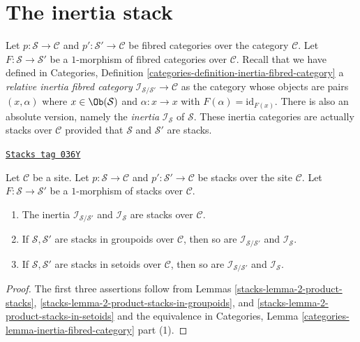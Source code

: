 \section{The inertia stack}
\label{stacks-section-the-inertia-stack}
Let
$p : \mathcal{S} \to \mathcal{C}$ and
$p' : \mathcal{S}' \to \mathcal{C}$
be fibred categories over the category $\mathcal{C}$.
Let $F : \mathcal{S} \to \mathcal{S}'$ be a $1$-morphism of
fibred categories over $\mathcal{C}$.
Recall that we have defined in
Categories, Definition \ref{categories-definition-inertia-fibred-category}
a {\it relative inertia fibred category}
$\mathcal{I}_{\mathcal{S}/\mathcal{S}'} \to \mathcal{C}$ as the
category whose objects are pairs $(x , \alpha)$ where
$x \in \Ob(\mathcal{S})$ and $\alpha : x \to x$ with
$F(\alpha) = \text{id}_{F(x)}$. There is also an absolute version,
namely the {\it inertia} $\mathcal{I}_\mathcal{S}$ of $\mathcal{S}$.
These inertia categories are actually stacks over $\mathcal{C}$ provided
that $\mathcal{S}$ and $\mathcal{S}'$ are stacks.

\begin{lemma}[Inertia]
\label{stacks-lemma-inertia}
\href{https://stacks.math.columbia.edu/tag/036Y}{\texttt{Stacks tag 036Y}}

Let $\mathcal{C}$ be a site. Let
$p : \mathcal{S} \to \mathcal{C}$ and
$p' : \mathcal{S}' \to \mathcal{C}$
be stacks over the site $\mathcal{C}$.
Let $F : \mathcal{S} \to \mathcal{S}'$ be a $1$-morphism of
stacks over $\mathcal{C}$.
\begin{enumerate}
\item The inertia $\mathcal{I}_{\mathcal{S}/\mathcal{S}'}$ and
$\mathcal{I}_\mathcal{S}$ are stacks over $\mathcal{C}$.
\item If $\mathcal{S}, \mathcal{S}'$ are stacks in groupoids over
$\mathcal{C}$, then so are $\mathcal{I}_{\mathcal{S}/\mathcal{S}'}$ and
$\mathcal{I}_\mathcal{S}$.
\item If $\mathcal{S}, \mathcal{S}'$ are stacks in setoids over $\mathcal{C}$,
then so are $\mathcal{I}_{\mathcal{S}/\mathcal{S}'}$ and
$\mathcal{I}_\mathcal{S}$.
\end{enumerate}
\end{lemma}

\begin{proof}

The first three assertions follow from
Lemmas \ref{stacks-lemma-2-product-stacks},
\ref{stacks-lemma-2-product-stacks-in-groupoids}, and
\ref{stacks-lemma-2-product-stacks-in-setoids}
and the equivalence in
Categories, Lemma \ref{categories-lemma-inertia-fibred-category} part (1).
\end{proof}

